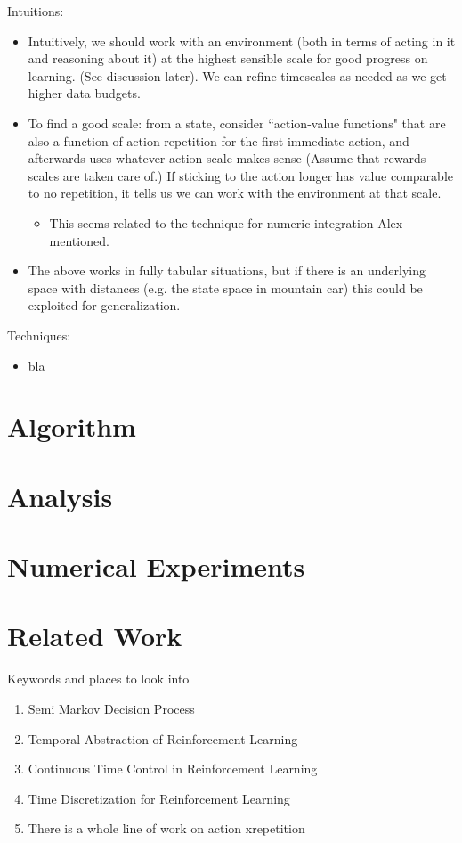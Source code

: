\documentclass[11pt]{article}
\begin{document}
Intuitions:
\begin{itemize}
    \item Intuitively, we should work with an environment (both in terms of acting in it and reasoning about it) at the highest sensible scale for good progress on learning. (See discussion later). We can refine timescales as needed as we get higher data budgets.
    \item To find a good scale: from a state, consider ``action-value functions" that are also a function of action repetition for the first immediate action, and afterwards uses whatever action scale makes sense (Assume that rewards scales are taken care of.) If sticking to the action longer has value comparable to no repetition, it tells us we can work with the environment at that scale.
    \begin{itemize}
        \item This seems related to the technique for numeric integration Alex mentioned.
    \end{itemize}
    \item The above works in fully tabular situations, but if there is an underlying space with distances (e.g. the state space in mountain car) this could be exploited for generalization.
\end{itemize}

Techniques:
\begin{itemize}
    \item bla
\end{itemize}




\section{Algorithm}
\section{Analysis}
\section{Numerical Experiments}
\section{Related Work}
Keywords and places to look into
\begin{enumerate}
    \item Semi Markov Decision Process
    \item Temporal Abstraction of Reinforcement Learning
    \item Continuous Time Control in Reinforcement Learning
    \item Time Discretization for Reinforcement Learning
    \item There is a whole line of work on action xrepetition
\end{enumerate}
\end{document}
